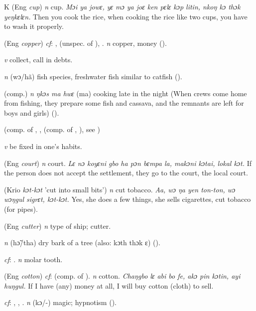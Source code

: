 \begin{letter}{K}
 (Eng \textit{cup}) \textit{n} cup. \textit{Mɔi ya jowɛ, yɛ mɔ ya joɛ ken pɛlɛ kɔp litin, nkoŋ kɔ thɔk yeŋkɛlɛn.} Then you cook the rice, when cooking the rice like two cups, you have to wash it properly.

 (Eng \textit{copper}) \textit{cf}: ,  (unspec. of ), . \textit{n} copper, money (\citealt{Pichl1967}).

 \textit{v} collect, call in debts. 

 \textit{n} (wɔ/hã) fish species, freshwater fish similar to catfish (\citealt{Pichl1967}). 

 (comp.) \textit{n} \textit{ŋkɔs ma hwɛ} (ma) cooking late in the night (When crews come home from fishing, they prepare some fish and cassava, and the remnants are left for boys and girls) (\citealt{Pichl1967}). 

 (comp. of , ,  (comp. of , ), see ) 

 \textit{v} be fixed in one's habits.

 (Eng \textit{court}) \textit{n} court. \textit{Lɛ nɔ koyɛni gbo ha pɔn bɛmpa la, makɔni kɔtai, lokal kɔt.} If the person does not accept the settlement, they go to the court, the local court.

 (Krio \textit{kɔt-kɔt} 'cut into small bits') \textit{n} cut tobacco. \textit{Aa, wɔ ŋa yen ton-ton, wɔ wɔŋgul sigrɛt, kɔt-kɔt.} Yes, she does a few things, she sells cigarettes, cut tobacco (for pipes).

 (Eng \textit{cutter}) \textit{n} type of ship; cutter.

 \textit{n} (hɔ̃/tha) dry bark of a tree (also: kɔth thɔk ɛ) (\citealt{Pichl1967}).

 \textit{cf}: . \textit{n} molar tooth.

 (Eng \textit{cotton}) \textit{cf}:  (comp. of ). \textit{n} cotton. \textit{Chaŋgbo lɛ abi bo fe, akɔ pin kɔtin, ayi huŋgul.} If I have (any) money at all, I will buy cotton (cloth) to sell. 

 \textit{cf}: , , . \textit{n} (kɔ/-) magic; hypnotism (\citealt{Pichl1967}).


\end{letter}
